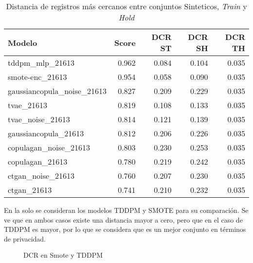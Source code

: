 \begin{table}[H]
    \centering
    \caption{Distancia de registros más cercanos entre conjuntos Sinteticos, \emph{Train} y \emph{Hold}}
    \label{tab-dcr}
    \begin{tabular}{|l|r|r|r|r|}
        \hline
        \rowcolor[gray]{0.8}
        Modelo & \textbf{Score}     & DCR ST & DCR SH & DCR TH \\ \hline
        tddpm\_mlp\_21613           & 0.962 & 0.084 & 0.104 & 0.035 \\ \hline
        smote-enc\_21613            & 0.954 & 0.058 & 0.090 & 0.035 \\ \hline
        gaussiancopula\_noise\_21613& 0.827 & 0.209 & 0.229 & 0.035 \\ \hline
        tvae\_21613                 & 0.819 & 0.108 & 0.133 & 0.035 \\ \hline
        tvae\_noise\_21613          & 0.814 & 0.121 & 0.139 & 0.035 \\ \hline
        gaussiancopula\_21613       & 0.812 & 0.206 & 0.226 & 0.035 \\ \hline
        copulagan\_noise\_21613     & 0.803 & 0.230 & 0.253 & 0.035 \\ \hline
        copulagan\_21613            & 0.780 & 0.219 & 0.242 & 0.035 \\ \hline
        ctgan\_noise\_21613         & 0.760 & 0.207 & 0.230 & 0.035 \\ \hline
        ctgan\_21613                & 0.741 & 0.210 & 0.232 & 0.035 \\ \hline
    \end{tabular}
\end{table}

En la  solo se consideran los modelos TDDPM y SMOTE para su comparación. Se ve que en ambos casos existe una distancia mayor a cero, pero que en el caso de TDDPM es mayor, por lo que se considera que es un mejor conjunto en términos de privacidad.
\begin{figure}[H]
    \centering
    
    \caption{DCR en Smote y TDDPM}
    \label{top2-dcr}
\end{figure}